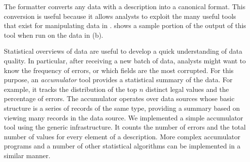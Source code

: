 The \xml{} formatter converts any data with a \padsml{} description into a canonical \xml{} format.  This conversion is useful because it allows analysts to exploit the many useful tools that exist for manipulating data in \xml{}.   shows a sample portion of the output of this tool when run on the \dibbler{} data in (b).  

Statistical overviews of data are useful to develop a quick understanding of data quality.  In particular,  after receiving a new batch of data, analysts might want to know the frequency of errors, or which fields are the most corrupted. For this purpose, an \emph{accumulator} tool provides a statistical summary of the data. For example, it tracks the distribution of the top $n$
distinct legal values and the percentage of errors. 
The accumulator operates over data sources
whose basic structure is a series of records of the same type, 
providing a summary based on viewing many records
in the data source.  We implemented a simple accumulator tool using the generic infrastructure.  It counts the number of errors and the total number of values for every element of a description.  More complex accumulator programs and a number of other statistical algorithms can be implemented in a similar manner.






